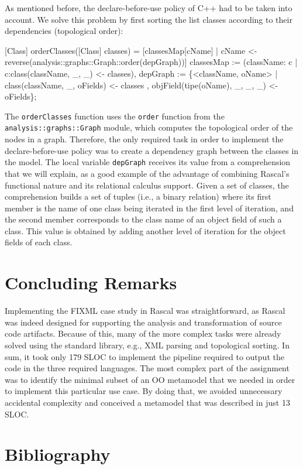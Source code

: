 \documentclass[submission,copyright,creativecommons]{eptcs}
\begin{document}
As  mentioned before, the declare-before-use policy of C++ had to be taken into account.
We solve this problem by first sorting the list classes according to their dependencies (topological order): 

\begin{rascal}
[Class] orderClasses([Class] classes) =
    {}[classesMap{}[cName] | cName \textless{}- reverse(analysis::graphs::Graph::order(depGraph))]
     classesMap := (className: c | c:class(className, \_{}, \_{}) \textless{}- classes),
         depGraph := \{{}\textless{}className, oName\textgreater{} | class(className, \_{}, oFields) \textless{}- classes
                                         , objField(tipe(oName), \_{}, \_{}, \_{}) \textless{}- oFields\}{};
\end{rascal}

The \texttt{orderClasses} function uses the \texttt{order} function from the \texttt{analysis::graphs::Graph} module, which computes the topological order of the nodes in a graph. Therefore, the only required task in order to implement the declare-before-use policy was to create a dependency graph between the classes in the model.  The local variable \texttt{depGraph} receives its value from a comprehension that we will explain, as a good example of the advantage of combining Rascal's functional nature and its relational calculus support. Given a set of classes, the comprehension builds a set of tuples (i.e., a binary relation) where its first member is the name of one class being iterated in the first level of iteration, and the second member corresponds to the class name of an object field of such a class. This value is obtained by adding another level of iteration for the object fields of each class.

\section{Concluding Remarks}
Implementing the FIXML case study in Rascal was straightforward, as Rascal was indeed designed for supporting the analysis and transformation of source code artifacts. Because of this, many of the more complex tasks were already solved using the standard library, e.g., XML parsing and topological sorting. In sum, it took only 179 SLOC to implement the pipeline required to output the code in the three required languages. The most complex part of the assignment was to identify the minimal subset of an OO metamodel that we needed in order to implement this particular use case. By doing that, we avoided unnecessary accidental complexity and conceived a metamodel that was described in just 13 SLOC.

\section{Bibliography}

\nocite{*}


\end{document}

